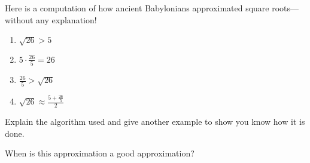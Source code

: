 \documentclass{ximera}
\begin{document}
\begin{question}
Here is a computation of how ancient Babylonians approximated square
roots---without any explanation!
\begin{enumerate}
\item $\sqrt{26}> 5$
\item $5 \cdot \frac{26}{5} = 26$
\item $\frac{26}{5}> \sqrt{26}$
\item $\sqrt{26}\approx \frac{5+\frac{26}{5}}{2}$
\end{enumerate}
Explain the algorithm used and give another example to show you know how it
is done.
\end{question}

\begin{exploration}
When is this approximation a good approximation?
\end{exploration}
\end{document}

